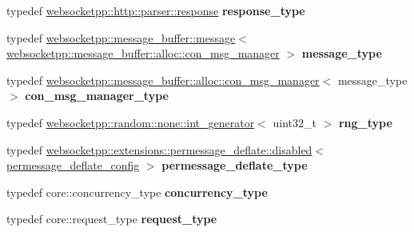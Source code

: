 \begin{DoxyCompactItemize}
\item 
typedef \hyperlink{classwebsocketpp_1_1http_1_1parser_1_1response}{websocketpp\+::http\+::parser\+::response} {\bfseries response\+\_\+type}\hypertarget{structstub__config_af1ff5c46d4fc72bce3b5fb9f6090f4d6}{}\label{structstub__config_af1ff5c46d4fc72bce3b5fb9f6090f4d6}

\item 
typedef \hyperlink{classwebsocketpp_1_1message__buffer_1_1message}{websocketpp\+::message\+\_\+buffer\+::message}$<$ \hyperlink{classwebsocketpp_1_1message__buffer_1_1alloc_1_1con__msg__manager}{websocketpp\+::message\+\_\+buffer\+::alloc\+::con\+\_\+msg\+\_\+manager} $>$ {\bfseries message\+\_\+type}\hypertarget{structstub__config_a251ee9935f06ff126dbdcae6af183493}{}\label{structstub__config_a251ee9935f06ff126dbdcae6af183493}

\item 
typedef \hyperlink{classwebsocketpp_1_1message__buffer_1_1alloc_1_1con__msg__manager}{websocketpp\+::message\+\_\+buffer\+::alloc\+::con\+\_\+msg\+\_\+manager}$<$ message\+\_\+type $>$ {\bfseries con\+\_\+msg\+\_\+manager\+\_\+type}\hypertarget{structstub__config_a590413e515623cd51f1cd6c0f72f1018}{}\label{structstub__config_a590413e515623cd51f1cd6c0f72f1018}

\item 
typedef \hyperlink{classwebsocketpp_1_1random_1_1none_1_1int__generator}{websocketpp\+::random\+::none\+::int\+\_\+generator}$<$ uint32\+\_\+t $>$ {\bfseries rng\+\_\+type}\hypertarget{structstub__config_aeea6c7fab96f8cc229d78a822ff9cc5d}{}\label{structstub__config_aeea6c7fab96f8cc229d78a822ff9cc5d}

\item 
typedef \hyperlink{classwebsocketpp_1_1extensions_1_1permessage__deflate_1_1disabled}{websocketpp\+::extensions\+::permessage\+\_\+deflate\+::disabled}$<$ \hyperlink{structstub__config_1_1permessage__deflate__config}{permessage\+\_\+deflate\+\_\+config} $>$ {\bfseries permessage\+\_\+deflate\+\_\+type}\hypertarget{structstub__config_a542a8c30b8eec0e129d9487b3a598bdb}{}\label{structstub__config_a542a8c30b8eec0e129d9487b3a598bdb}

\item 
typedef core\+::concurrency\+\_\+type {\bfseries concurrency\+\_\+type}\hypertarget{structstub__config_adfbabf7bc98d14349e3aaf93ce286679}{}\label{structstub__config_adfbabf7bc98d14349e3aaf93ce286679}

\item 
typedef core\+::request\+\_\+type {\bfseries request\+\_\+type}\hypertarget{structstub__config_adf25cb289c00f17e0edde3ee14c7d513}{}\label{structstub__config_adf25cb289c00f17e0edde3ee14c7d513}


\end{DoxyCompactItemize}
